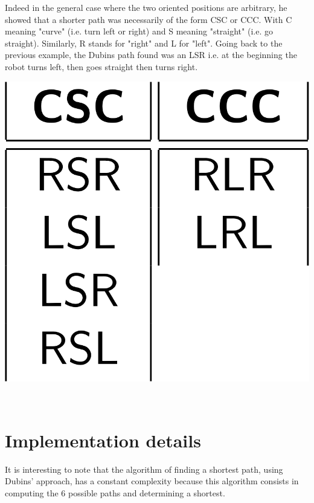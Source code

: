 \documentclass[11pt,a4paper]{article}
\begin{document}
	\begin{minipage}{0.9\textwidth}
	\raggedright
	Indeed in the general case where the two oriented positions are arbitrary, he showed that a shorter path was necessarily of the form CSC or CCC. With C meaning "curve" (i.e. turn left or right) and S meaning "straight" (i.e. go straight). Similarly, R stands for "right" and L for "left". Going back to the previous example, the Dubins path found was an LSR i.e. at the beginning the robot turns left, then goes straight then turns right.
	\end{minipage}
	\begin{minipage}{0.1\textwidth}
	\includegraphics[width=\linewidth]{Illustrations/combinaisonsSummary.png}
	\end{minipage}\\
	
	\section{Implementation details}
	
	It is interesting to note that the algorithm of finding a shortest path, using Dubins' approach, has a constant complexity because this algorithm consists in computing the 6 possible paths and determining a shortest.
	
\end{document}
